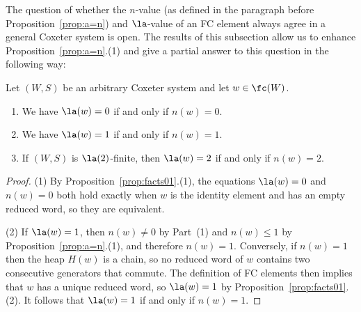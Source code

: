     \begin{remark}
      \label{rmk:a.vs.n}
      The question of whether the $n$-value (as defined in the paragraph before Proposition~\ref{prop:a=n}) and
      $\la$-value of an FC element always agree in a general Coxeter system is open. The results of
      this subsection allow us to enhance Proposition~\ref{prop:a=n}.(1) and give a partial answer to this
      question in the following way: 

\begin{prop} 
\label{prop:a.vs.n}
Let $(W,S)$ be an arbitrary Coxeter system and let $w\in \fc(W)$.  \begin{enumerate} \item We
   have $\la(w)=0$ if and only if $n(w)=0$.  \item We have $\la(w)=1$ if and only if
   $n(w)=1$.
\item If $(W,S)$ is $\la(2)$-finite, then $\la(w)=2$ if and only if $n(w)=2$.  \end{enumerate}
  \end{prop} 
\begin{proof} (1) By Proposition~\ref{prop:facts01}.(1), the equations $\la(w)=0$ and $n(w)=0$ both hold
     exactly when $w$ is the identity element and has an empty reduced word, so they are
     equivalent.

(2) If $\la(w)=1$, then $n(w)\neq 0$ by Part~(1) and $n(w)\le 1$ by Proposition~\ref{prop:a=n}.(1), and
therefore $n(w)=1$.  Conversely, if $n(w)=1$ then the heap $H(w)$ is a chain, so no reduced word
of $w$ contains two consecutive generators that commute. The definition of FC elements then
implies that $w$ has a unique reduced word, so $\la(w)=1$ by Proposition~\ref{prop:facts01}.(2). It follows
that $\la(w)=1$ if and only if $n(w)=1$.


\end{proof}
\end{remark}
